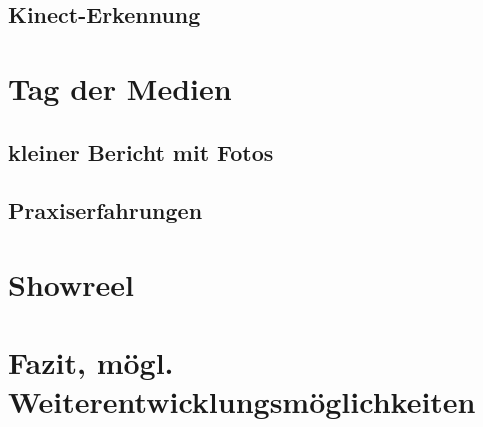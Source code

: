 \subsection{Kinect-Erkennung}


\section{Tag der Medien}
\subsection{kleiner Bericht mit Fotos}
\subsection{Praxiserfahrungen}

\section{Showreel}
\section{Fazit, mögl. Weiterentwicklungsmöglichkeiten}

